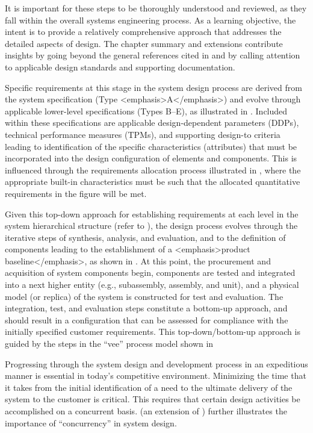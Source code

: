 It is important for these steps to be thoroughly understood and reviewed, as they fall within the overall systems engineering process. As a learning objective, the intent is to provide a relatively comprehensive approach that addresses the detailed aspects of design. The chapter summary and extensions contribute insights by going beyond the general references cited in and by calling attention to applicable design standards and supporting documentation.

Specific requirements at this stage in the system design process are derived from the system specification (Type <emphasis>A</emphasis>) and evolve through applicable lower-level specifications (Types B–E), as illustrated in . Included within these specifications are applicable design-dependent parameters (DDPs), technical performance measures (TPMs), and supporting design-to criteria leading to identification of the specific characteristics (attributes) that must be incorporated into the design configuration of elements and components. This is influenced through the requirements allocation process illustrated in , where the appropriate built-in characteristics must be such that the allocated quantitative requirements in the figure will be met.

Given this top-down approach for establishing requirements at each level in the system hierarchical structure (refer to ), the design process evolves through the iterative steps of synthesis, analysis, and evaluation, and to the definition of components leading to the establishment of a <emphasis>product baseline</emphasis>, as shown in . At this point, the procurement and acquisition of system components begin, components are tested and integrated into a next higher entity (e.g., subassembly, assembly, and unit), and a physical model (or replica) of the system is constructed for test and evaluation. The integration, test, and evaluation steps constitute a bottom-up approach, and should result in a configuration that can be assessed for compliance with the initially specified customer requirements. This top-down/bottom-up approach is guided by the steps in the ``vee'' process model shown in 

Progressing through the system design and development process in an expeditious manner is essential in today’s competitive environment. Minimizing the time that it takes from the initial identification of a need to the ultimate delivery of the system to the customer is critical. This requires that certain design activities be accomplished on a concurrent basis. (an extension of ) further illustrates the importance of ``concurrency'' in system design.

